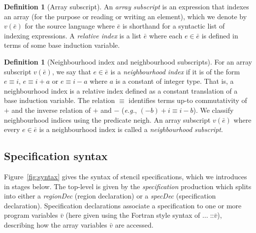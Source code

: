 \documentclass[9pt]{sigplanconf}
\newcounter{block}
\theoremstyle{definition}
\newtheorem{definition}[block]{Definition}
\newcommand{\eg}{\emph{e.g.}}
\newcommand{\nonterm}[1]{\textit{#1}}
\newcommand{\neigh}{\textsf{neigh}}
\begin{document}
\begin{definition}[Array subscript]
  An \emph{array subscript} is an expression that indexes an array
  (for the purpose or reading or writing an element), which we denote
  by $v(\bar{e})$ for the source language where $\bar{e}$ is shorthand
  for a syntactic list of indexing expressions. A \emph{relative
    index} is a list $\bar{e}$ where each $e \in \bar{e}$ is defined
  in terms of some base induction variable.
\end{definition}

\begin{definition}[Neighbourhood index and neighbourhood subscripts]
  For an array subscript $v(\bar{e})$, we say that $e \in \bar{e}$
  is a \emph{neighbourhood index} if it is of the form
  $e \equiv i$, $e \equiv i + a$ or $e \equiv i - a$ where $a$ is a
  constant of integer type. That is, a neighbourhood index is a
  relative index defined as a constant translation of a base induction
  variable. The relation $\equiv$ identifies terms up-to commutativity
  of $+$ and the inverse relation of $+$ and $-$ (\eg{},
  $(-b) + i \equiv i - b$).  We classify neighbourhood indices using
  the predicate \neigh{}. An array subscript $v(\bar{e})$ where every
 $e \in \bar{e}$ is a neighbourhood index is called a
 \emph{neighbourhood subscript}.
\label{def:neighbour}
\end{definition}


\subsection{Specification syntax}
\label{sec:syntax}

Figure~\ref{fig:syntax} gives the syntax of stencil specifications,
which we introduces in stages below.  The top-level is given by the
\nonterm{specification} production which splits into either a
\nonterm{regionDec} (region declaration) or a \nonterm{specDec}
(specification declaration). Specification declarations associate a
specification to one or more program variables $\bar{v}$ (here given
using the Fortran style syntax of $\ldots \; \texttt{::} \bar{v}$),
describing how the array variables $\bar{v}$ are accessed.

\end{document}
